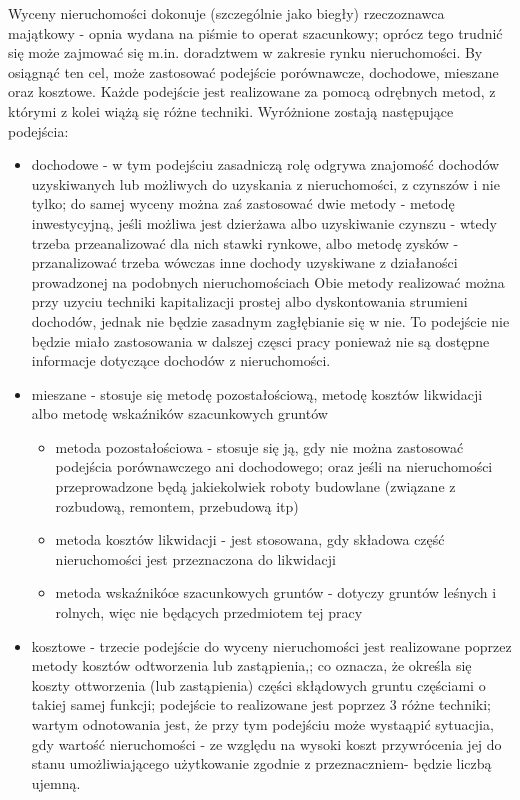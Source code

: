 \documentclass[a4paper,12pt,twoside,openany]{report}
\begin{document}
Wyceny nieruchomości dokonuje (szczególnie jako biegły) rzeczoznawca majątkowy - opnia wydana na piśmie to operat szacunkowy\cite{Operat}; oprócz tego trudnić się może zajmować się m.in. doradztwem w zakresie rynku nieruchomości\cite{Operat2}. By osiągnąć ten cel, może zastosować podejście porównawcze, dochodowe, mieszane oraz kosztowe. Każde podejście jest realizowane za pomocą odrębnych metod, z którymi z kolei wiążą się różne techniki.
Wyróżnione zostają następujące podejścia:
\begin{itemize}

\item dochodowe - w tym podejściu zasadniczą rolę odgrywa znajomość dochodów uzyskiwanych lub możliwych do uzyskania z nieruchomości, z czynszów i nie tylko; do samej wyceny można zaś zastosować dwie metody -  metodę inwestycyjną, jeśli możliwa jest dzierżawa albo uzyskiwanie czynszu - wtedy trzeba przeanalizować dla nich stawki rynkowe, albo metodę zysków - przanalizować trzeba wówczas inne dochody uzyskiwane z działaności prowadzonej na podobnych nieruchomościach
Obie metody realizować można przy uzyciu techniki kapitalizacji prostej albo dyskontowania strumieni dochodów, jednak nie będzie zasadnym zagłębianie się w nie. To podejście nie będzie miało zastosowania w dalszej częsci pracy ponieważ nie są dostępne informacje dotyczące dochodów z nieruchomości.



\item mieszane - stosuje się metodę pozostałościową, metodę kosztów likwidacji albo metodę wskaźników szacunkowych gruntów

\begin{itemize}
\item metoda pozostałościowa - stosuje się ją, gdy nie można zastosować podejścia porównawczego ani dochodowego; oraz jeśli na nieruchomości przeprowadzone będą jakiekolwiek roboty budowlane (związane z rozbudową, remontem, przebudową itp)
\item metoda kosztów likwidacji - jest stosowana, gdy składowa część nieruchomości jest przeznaczona do likwidacji
\item metoda wskaźnikóœ szacunkowych gruntów - dotyczy gruntów leśnych i rolnych, więc nie będących przedmiotem tej pracy
\end{itemize}

\item kosztowe - trzecie podejście do wyceny nieruchomości jest realizowane poprzez metody kosztów odtworzenia  lub zastąpienia,; co oznacza, że określa się koszty ottworzenia (lub zastąpienia)  części skłądowych gruntu częściami o takiej samej funkcji; podejście to realizowane jest poprzez 3 różne techniki; wartym odnotowania jest, że przy tym podejściu może wystaąpić sytuacjia, gdy wartość nieruchomości - ze względu na wysoki koszt przywrócenia jej do stanu umożliwiającego użytkowanie zgodnie z przeznaczniem- będzie liczbą ujemną.


\end{itemize}
\end{document}
